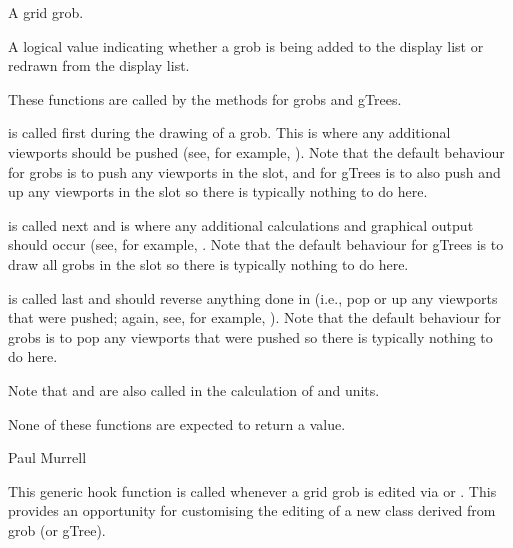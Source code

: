 %
\begin{Arguments}
\begin{ldescription}
\item[\code{x}]  A grid grob. 
\item[\code{recording}]  A logical value indicating whether a grob
is being added to the display list or redrawn from the display list. 
\end{ldescription}
\end{Arguments}
%
\begin{Details}\relax
These functions are called by the  methods for grobs
and gTrees.

 is called first during the drawing of a grob.
This is where any additional viewports should be pushed (see,
for example, ).  Note that
the default behaviour for grobs is to push any viewports in the
 slot, and for gTrees is to also push and up any viewports in the
 slot so there is typically nothing to do here.

 is called next and is where any additional
calculations and graphical output should occur (see, for example,
.  Note that the default behaviour
for gTrees is to draw all grobs in the  slot
so there is typically nothing to do here.

 is called last and should reverse anything
done in  (i.e., pop or up any viewports that were
pushed;  again, see,
for example, ).  Note that the
default behaviour for grobs is to pop any viewports that were pushed
so there is typically nothing to do here.

Note that  and  are
also called in the calculation of  and
 units.
\end{Details}
%
\begin{Value}
None of these functions are expected to return a value.
\end{Value}
%
\begin{Author}\relax
 Paul Murrell 
\end{Author}
%
\begin{SeeAlso}\relax
\end{SeeAlso}
%
\begin{Description}\relax
This generic hook function is called whenever a grid grob is edited
via  or .
This provides an opportunity for customising the editing of a
new class derived from grob (or gTree).
\end{Description}
